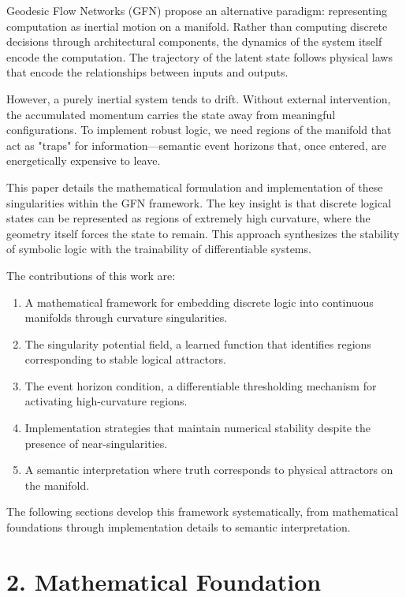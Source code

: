 \documentclass[12pt,letterpaper,twoside]{article}
\begin{document}
Geodesic Flow Networks (GFN) propose an alternative paradigm: representing computation as inertial motion on a manifold. Rather than computing discrete decisions through architectural components, the dynamics of the system itself encode the computation. The trajectory of the latent state follows physical laws that encode the relationships between inputs and outputs.

However, a purely inertial system tends to drift. Without external intervention, the accumulated momentum carries the state away from meaningful configurations. To implement robust logic, we need regions of the manifold that act as "traps" for information—semantic event horizons that, once entered, are energetically expensive to leave.

This paper details the mathematical formulation and implementation of these singularities within the GFN framework. The key insight is that discrete logical states can be represented as regions of extremely high curvature, where the geometry itself forces the state to remain. This approach synthesizes the stability of symbolic logic with the trainability of differentiable systems.

The contributions of this work are:
\begin{enumerate}
    \item A mathematical framework for embedding discrete logic into continuous manifolds through curvature singularities.
    \item The singularity potential field, a learned function that identifies regions corresponding to stable logical attractors.
    \item The event horizon condition, a differentiable thresholding mechanism for activating high-curvature regions.
    \item Implementation strategies that maintain numerical stability despite the presence of near-singularities.
    \item A semantic interpretation where truth corresponds to physical attractors on the manifold.
\end{enumerate}

The following sections develop this framework systematically, from mathematical foundations through implementation details to semantic interpretation.

\section{2. Mathematical Foundation}
\end{document}

